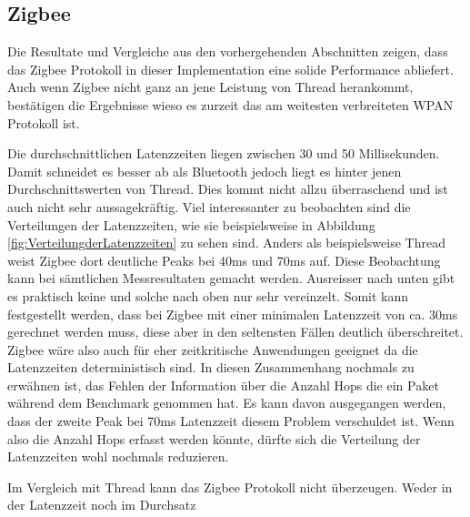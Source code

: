 \subsection{Zigbee}\label{subsec:Zigbee}

Die Resultate und Vergleiche aus den vorhergehenden Abschnitten zeigen, dass das Zigbee Protokoll in dieser Implementation eine solide Performance abliefert.
Auch wenn Zigbee nicht ganz an jene Leistung von Thread herankommt, bestätigen die Ergebnisse wieso es zurzeit das am weitesten verbreiteten WPAN Protokoll ist.

Die durchschnittlichen Latenzzeiten liegen zwischen 30 und 50 Millisekunden. Damit schneidet es besser ab als Bluetooth jedoch liegt es hinter jenen Durchschnittswerten von Thread.
Dies kommt nicht allzu überraschend und ist auch nicht sehr aussagekräftig.
Viel interessanter zu beobachten sind die Verteilungen der Latenzzeiten, wie sie beispielsweise in Abbildung \ref{fig:VerteilungderLatenzzeiten} zu sehen sind.
Anders als beispielsweise Thread weist Zigbee dort deutliche Peaks bei 40ms und 70ms auf.
Diese Beobachtung kann bei sämtlichen Messresultaten gemacht werden.
Ausreisser nach unten gibt es praktisch keine und solche nach oben nur sehr vereinzelt.
Somit kann festgestellt werden, dass bei Zigbee mit einer minimalen Latenzzeit von ca. 30ms gerechnet werden muss, diese aber in den seltensten Fällen deutlich überschreitet.
Zigbee wäre also auch für eher zeitkritische Anwendungen geeignet da die Latenzzeiten deterministisch sind.
In diesen Zusammenhang nochmals zu erwähnen ist, das Fehlen der Information über die Anzahl Hops die ein Paket während dem Benchmark genommen hat.
Es kann davon ausgegangen werden, dass der zweite Peak bei 70ms Latenzzeit diesem Problem verschuldet ist.
Wenn also die Anzahl Hops erfasst werden könnte, dürfte sich die Verteilung der Latenzzeiten wohl nochmals reduzieren.




Im Vergleich mit Thread kann das Zigbee Protokoll nicht überzeugen.
Weder in der Latenzzeit noch im Durchsatz 




